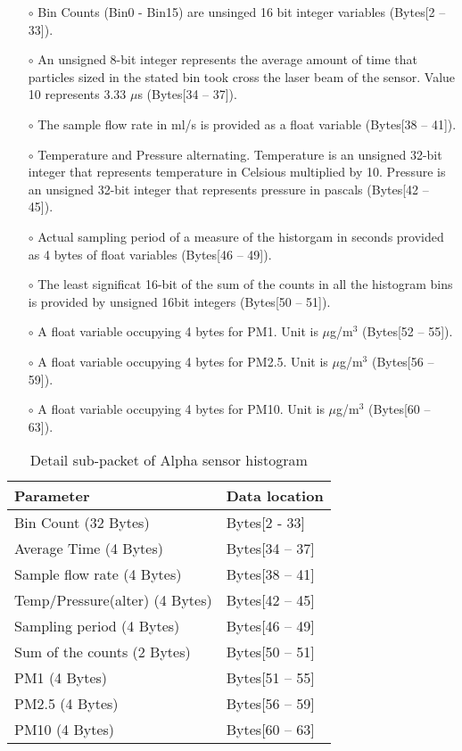 \begin{itemize}
\setlength\itemsep{0em}
\item[$\circ$] Bin Counts (Bin0 - Bin15) are unsinged 16 bit integer variables (Bytes[2 -- 33]).
\item[$\circ$] An unsigned 8-bit integer represents the average amount of time that particles sized in the stated bin took cross the laser beam of the sensor. Value 10 represents 3.33 $\mu$s (Bytes[34 -- 37]).
\item[$\circ$] The sample flow rate in ml/s is provided as a float variable (Bytes[38 -- 41]).
\item[$\circ$] Temperature and Pressure alternating. Temperature is an unsigned 32-bit integer that represents temperature in Celsious multiplied by 10. Pressure is an unsigned 32-bit integer that represents pressure in pascals (Bytes[42 -- 45]).
\item[$\circ$] Actual sampling period of a measure of the historgam in seconds provided as 4 bytes of float variables (Bytes[46 -- 49]).
\item[$\circ$] The least significat 16-bit of the sum of the counts in all the histogram bins is provided by unsigned 16bit integers (Bytes[50 -- 51]).
\item[$\circ$] A float variable occupying 4 bytes for PM1. Unit is $\mu$g/m$^3$ (Bytes[52 -- 55]).
\item[$\circ$] A float variable occupying 4 bytes for PM2.5. Unit is $\mu$g/m$^3$ (Bytes[56 -- 59]).
\item[$\circ$] A float variable occupying 4 bytes for PM10. Unit is $\mu$g/m$^3$ (Bytes[60 -- 63]).
\end{itemize}


\begin{table}[h!]
    \centering
    \caption{Detail sub-packet of Alpha sensor histogram}
    \begin{tabular}{|>{\centering\arraybackslash}p{}|>{\centering\arraybackslash}p{}|}
        \hline
        \rowcolor{black!8}
        \textbf{Parameter} & \textbf{Data location}\\ \hline
        Bin Count (32 Bytes) & Bytes[2 - 33] \\ \hline
        Average Time (4 Bytes) & Bytes[34 -- 37] \\ \hline
        Sample flow rate (4 Bytes) & Bytes[38 -- 41] \\ \hline
        Temp/Pressure(alter) (4 Bytes) & Bytes[42 -- 45] \\ \hline
        Sampling period (4 Bytes) & Bytes[46 -- 49] \\ \hline
        Sum of the counts (2 Bytes) & Bytes[50 -- 51] \\ \hline
        PM1 (4 Bytes) & Bytes[51 -- 55] \\ \hline
        PM2.5 (4 Bytes) & Bytes[56 -- 59] \\ \hline
        PM10 (4 Bytes) & Bytes[60 -- 63] \\ \hline
    \end{tabular}
\end{table}



